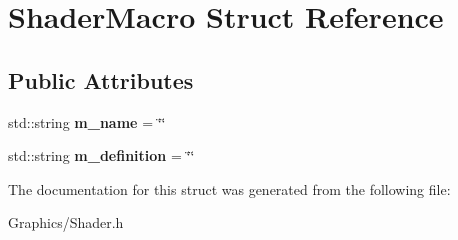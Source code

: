 \hypertarget{structShaderMacro}{}\section{Shader\+Macro Struct Reference}
\label{structShaderMacro}
\subsection*{Public Attributes}
\begin{DoxyCompactItemize}
\item 
\mbox{\label{structShaderMacro_a7c53c35066bcf340f32d386bf4617b56}} 
std\+::string {\bfseries m\+\_\+name} = \char`\"{}\char`\"{}
\item 
\mbox{\label{structShaderMacro_a3541fe2eb5e3b11b989dedd824dba461}} 
std\+::string {\bfseries m\+\_\+definition} = \char`\"{}\char`\"{}
\end{DoxyCompactItemize}


The documentation for this struct was generated from the following file\+:\begin{DoxyCompactItemize}
\item 
Graphics/Shader.\+h\end{DoxyCompactItemize}
